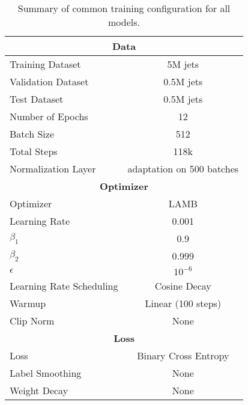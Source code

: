 \begin{table}[h]
    \centering
    \caption{Summary of common training configuration for all models.}
    \label{tab:training_config}
    \begin{tabular}{@{}lc@{}}
        \toprule
        \multicolumn{2}{c}{\textbf{Data}} \\
        \midrule
        Training Dataset & 5M jets \\
        Validation Dataset & 0.5M jets \\
        Test Dataset & 0.5M jets \\
        Number of Epochs & 12 \\
        Batch Size & 512 \\
        Total Steps & 118k \\
        Normalization Layer & adaptation on 500 batches \\
        \midrule
        \multicolumn{2}{c}{\textbf{Optimizer}} \\
        \midrule
        Optimizer & LAMB \\
        Learning Rate & 0.001  \\
        $\beta_1$ & 0.9 \\
        $\beta_2$ & 0.999 \\
        $\epsilon$ & $10^{-6}$ \\
        Learning Rate Scheduling & Cosine Decay \\
        Warmup & Linear (100 steps) \\
        Clip Norm & None \\
        \midrule
        \multicolumn{2}{c}{\textbf{Loss}} \\
        \midrule
        Loss & Binary Cross Entropy \\
        Label Smoothing & None \\
        Weight Decay & None \\
        \bottomrule
        \end{tabular}
        \end{table}
        
        
        
    